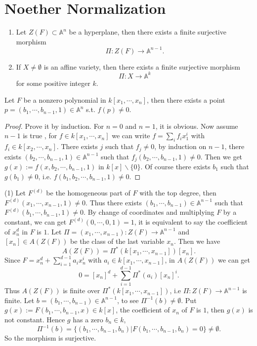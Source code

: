 \section{Noether Normalization}


\begin{theorem}\label{14-1}
  {}
  \noindent
	\begin{enumerate}
		\item Let $ Z(F) \subset \mathbb{A}^n$ be a hyperplane, then there exists a finite surjective morphism
		      $$
			      \Pi:Z(F)\to \mathbb{A}^{n-1}.
		      $$
		\item If $ X\neq \emptyset  $ is an affine variety, then there exists a finite surjective morphism
		      $$
			      \Pi:X\to \mathbb{A}^k
		      $$
		      for some positive integer $ k $.
	\end{enumerate}
\end{theorem}
\begin{lemma}
	Let $ F $ be a nonzero polynomial in $ k[x_1,\cdots,x_n] $, then there exists a point $ p=(b_1,\cdots,b_{n-1},1)\in\mathbb{A}^n $ s.t. $ f(p)\neq 0 $.
\end{lemma}
\begin{proof}
	Prove it by induction. For $ n=0 $ and $ n=1 $, it is obvious. Now assume $ n-1 $ is true , for $ f\in k[x_1,\cdots,x_n] $ we can write $ f=\sum\limits_{i}f_ix_1^i $ with $ f_i\in k[x_2,\cdots,x_{n}] $. There exists $ j $ such that $ f_j\neq 0$, by induction on $ n-1 $, there exists $ (b_2,\cdots,b_{n-1},1)\in \mathbb{A}^{n-1} $ such that $ f_j(b_2,\cdots,b_{n-1},1)\neq 0 $. Then we get $ g(x):=f(x,b_2,\cdots,b_{n-1},1) $ in $ k[x]\backslash\lbrace 0 \rbrace $. Of course there exists  $ b_1 $ such that $ g(b_1)\neq 0 $, i.e. $ f(b_1,b_2,\cdots,b_{n-1},1)\neq 0 $.
\end{proof}
	(1) Let $ F^{(d)} $ be the homogeneous part of $ F $ with the top degree, then $ F^{(d)}(x_1,\cdots,x_{n-1},1)\neq 0 $. Thus there exists $ (b_1,\cdots,b_{n-1})\in \mathbb{A}^{n-1} $ such that $ F^{(d)}(b_1,\cdots,b_{n-1},1)\neq 0 $. By change of coordinates and multiplying $ F $ by a constant, we can get $ F^{(d)}(0,\cdots,0,1)=1 $, it is equivalent to say the coefficient of $ x_n^d $ in $ F $ is $ 1 $. Let $ \Pi=(x_1,\cdots,x_{n-1}):Z(F)\to \mathbb{A}^{n-1} $ and $ [x_n]\in A(Z(F)) $ be the class of the last variable $ x_n $. Then we have
	$$
		A(Z(F))=\Pi^\ast (k[x_1,\cdots,x_{n-1}])[x_n].
	$$
	Since $ F=x_n^d+\sum\limits_{i=1}^{d-1}a_ix_n^i $ with $ a_i\in k[x_1,\cdots,x_{n-1}] $, in $ A(Z(F)) $ we can get
	$$
		0=[x_n]^d+\sum\limits_{i=1}^{d-1}\Pi^\ast (a_i)[x_n]^i.
	$$
	Thus $ A(Z(F)) $ is finite over $ \Pi^\ast(k[x_1,\cdots,x_{n-1}]) $, i.e $ \Pi:Z(F)\to \mathbb{A}^{n-1} $ is finite. Let $ b=(b_1,\cdots,b_{n-1})\in \mathbb{A}^{n-1} $, to see $ \Pi^{-1}(b)\neq \emptyset $. Put $ g(x):=F(b_1,\cdots,b_{n-1},x)\in k[x] $, the coefficient of $ x_n $ of $ F $ is $ 1 $, then $ g(x) $ is not constant. Hence $ g $ has a zero $ b_n\in k $,
	$$
		\Pi^{-1}(b)=\lbrace (b_1,\cdots,b_{n-1},b_n)|F(b_1,\cdots,b_{n-1},b_n)=0 \rbrace \neq \emptyset.
	$$
	So the morphism is surjective.

